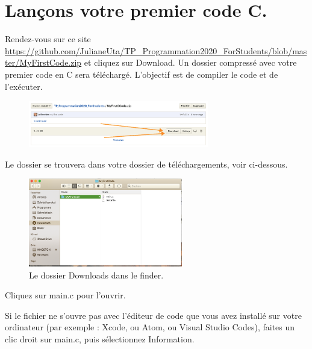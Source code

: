 \documentclass{article}
\begin{document}
\section{Lançons votre premier code C.}
Rendez-vous sur ce site \href{https://github.com/JulianeUta/TP_Programmation2020_ForStudents/blob/master/MyFirstCode.zip}{https://github.com/JulianeUta/TP\_Programmation2020\_ForStudents/blob/master/MyFirstCode.zip} et cliquez sur Download. Un dossier compressé avec votre premier code en C sera téléchargé. L'objectif est de compiler le code et de l'exécuter.
\begin{figure}[H]
\center
\includegraphics[width=0.7\textwidth]{Plots/FirstCode_1.png}
\end{figure}
Le dossier se trouvera dans votre dossier de téléchargements, voir ci-dessous.
\begin{figure}[H]
\center
\includegraphics[width=0.6\textwidth]{Plots/DownloadMyFirstCode.png}
\caption{Le dossier Downloads dans le finder.\label{F:locationMyFirstCode}}
\end{figure}
Cliquez sur main.c pour l'ouvrir. 

Si le fichier ne s'ouvre pas avec l'éditeur de code que vous avez installé sur votre ordinateur (par exemple : Xcode, ou Atom, ou Visual Studio Codes), faites un clic droit sur main.c, puis sélectionnez Information. 
\end{document}
